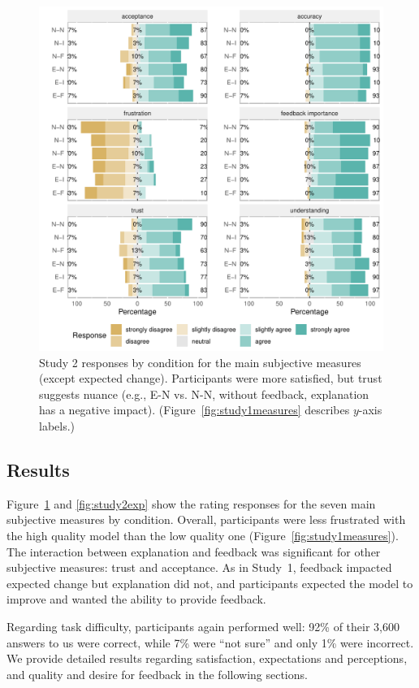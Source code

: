 \begin{figure}[t]
    \centering
    \includegraphics[width=.48\textwidth]{2020_chi_explanation/figures/study2-measures.pdf}
    \caption{Study 2 responses by condition for the main subjective measures (except expected change). Participants were more satisfied, but trust suggests nuance (e.g., E-N vs. N-N, without feedback, explanation has a negative impact).
    (Figure~\ref{fig:study1measures} describes $y$-axis labels.)}
    \label{fig:study2measures}
    \vspace{-10pt}
\end{figure}

\subsection{Results}
Figure~\ref{fig:study2measures} and \ref{fig:study2exp} show the rating responses for the seven main subjective measures by condition.
Overall, participants were less frustrated with the high quality model than the low quality one (Figure~\ref{fig:study1measures}). 
%
The interaction between explanation and feedback was significant for other subjective measures: trust and acceptance. 
As in Study~1, feedback impacted expected change but explanation did not, and participants expected the model to improve and wanted the ability to provide feedback.

Regarding task difficulty, participants again performed well: 92\% of their 3,600 answers to us were correct, while 7\% were ``not sure'' and only 1\% were incorrect. 
%
We provide detailed results regarding satisfaction, expectations and perceptions, and quality and desire for feedback in the following sections.



